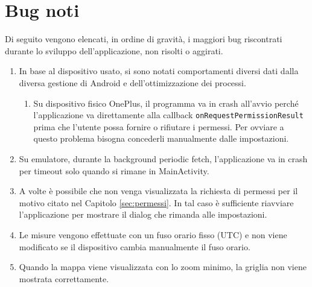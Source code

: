 \documentclass[11pt]{article}
\begin{document}
\section{Bug noti}
Di seguito vengono elencati, in ordine di gravità, i maggiori bug riscontrati durante lo sviluppo dell'applicazione, non risolti o aggirati.
\begin{enumerate}
    \item In base al dispositivo usato, si sono notati comportamenti diversi dati dalla diversa gestione di Android e dell'ottimizzazione dei processi.
    \begin{enumerate}
        \item Su dispositivo fisico OnePlus, il programma va in crash all'avvio perché l'applicazione va direttamente alla callback \texttt{onRequestPermissionResult} prima che l'utente possa fornire o rifiutare i permessi. Per ovviare a questo problema bisogna concederli manualmente dalle impostazioni.
    \end{enumerate}
    \item Su emulatore, durante la background periodic fetch, l'applicazione va in crash per timeout solo quando si rimane in MainActivity.
    \item A volte è possibile che non venga visualizzata la richiesta di permessi per il motivo citato nel Capitolo \ref{sec:permessi}. In tal caso è sufficiente riavviare l'applicazione per mostrare il dialog che rimanda alle impostazioni.
    \item Le misure vengono effettuate con un fuso orario fisso (UTC) e non viene modificato se il dispositivo cambia manualmente il fuso orario.
    \item Quando la mappa viene visualizzata con lo zoom minimo, la griglia non viene mostrata correttamente.
\end{enumerate}
\end{document}

